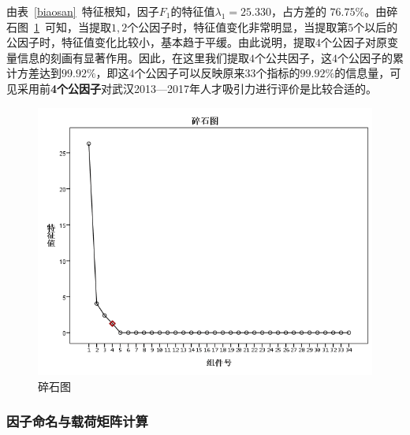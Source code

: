 \documentclass{whutmod}
\begin{document}
	
	由表~\ref{biaosan}~特征根知，因子$F_{1}$的特征值$\lambda_{1}=25.330$，占方差的 $76.75\%$。由碎石图~\ref{123}~可知，当提取$1,2$个公因子时，特征值变化非常明显，当提取第$5$个以后的公因子时，特征值变化比较小，基本趋于平缓。由此说明，提取$4$个公因子对原变量信息的刻画有显著作用。因此，在这里我们提取$4$个公共因子，这$4$个公因子的累计方差达到$99.92\%$，即这$4$个公因子可以反映原来$33$个指标的$99.92\%$的信息量，可见采用前\textbf{4个公因子}对武汉2013—2017年人才吸引力进行评价是比较合适的。
	
	\begin{figure}[H]
		\centering
		\includegraphics[width=\textwidth]{figures/123.png}
		\caption{碎石图}\label{123}
	\end{figure} 
	
	\subsubsection{因子命名与载荷矩阵计算}
\end{document}

